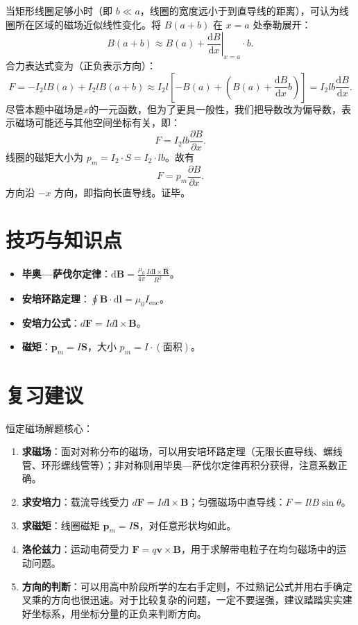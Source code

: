 \documentclass[11pt,a4paper]{ctexart}
\newcommand{\dd}{\mathrm{d}}
\begin{document}
当矩形线圈足够小时（即 $b \ll a$，线圈的宽度远小于到直导线的距离），可认为线圈所在区域的磁场近似线性变化。将 $B(a+b)$ 在 $x=a$ 处泰勒展开：
\[
B(a+b) \approx B(a) + \left.\frac{\dd B}{\dd x}\right|_{x=a} \cdot b.
\]
合力表达式变为（正负表示方向）：
\[
F = - I_2 l B(a)  + I_2 l B(a+b) \approx I_2 l \left[ - B(a) + \left( B(a) + \frac{\dd B}{\dd x} b \right) \right] = I_2 l b \frac{\dd B}{\dd x}.
\]
尽管本题中磁场是$x$的一元函数，但为了更具一般性，我们把导数改为偏导数，表示磁场可能还与其他空间坐标有关，即：
\[
F = I_2 l b\frac{\partial B}{\partial x}.
\]
线圈的磁矩大小为 $p_m = I_2 \cdot S = I_2 \cdot l b$。故有
\[
F = p_m \frac{\partial B}{\partial x}.
\]
方向沿 $−x$ 方向，即指向长直导线。证毕。

\section*{技巧与知识点}
\begin{tipBox}
\begin{itemize}
  \item \textbf{毕奥—萨伐尔定律}：\(\displaystyle \dd\boldsymbol{B} = \frac{\mu_0}{4\pi} \frac{I\dd\boldsymbol{l} \times \hat{\boldsymbol{R}}}{R^2}\)。
  \item \textbf{安培环路定理}：\(\displaystyle \oint \boldsymbol{B} \cdot \dd\boldsymbol{l} = \mu_0 I_{\text{enc}}\)。
  \item \textbf{安培力公式}：\(d \boldsymbol{F}=I d \boldsymbol{l}\times\boldsymbol{B}\)。
  \item \textbf{磁矩}：\(\displaystyle \boldsymbol{p}_m = I \boldsymbol{S}\)，大小 \(p_m = I \cdot (\text{面积})\)。
\end{itemize}
\end{tipBox}

\section*{复习建议}
\begin{tipBox}
恒定磁场解题核心：
\begin{enumerate}
  \item \textbf{求磁场}：面对对称分布的磁场，可以用安培环路定理（无限长直导线、螺线管、环形螺线管等）；非对称则用毕奥—萨伐尔定律再积分获得，注意系数正确。
  \item \textbf{求安培力}：载流导线受力 \( d \boldsymbol{F}=I d \boldsymbol{l}\times\boldsymbol{B}\)；匀强磁场中直导线：\(F=IlB\sin\theta\)。
  \item \textbf{求磁矩}：线圈磁矩 \(\boldsymbol{p}_m=I\boldsymbol{S}\)，对任意形状均如此。
  \item \textbf{洛伦兹力}：运动电荷受力 \(\boldsymbol{F}=q\boldsymbol{v}\times\boldsymbol{B}\)，用于求解带电粒子在均匀磁场中的运动问题。
  \item \textbf{方向的判断}：可以用高中阶段所学的左右手定则，不过熟记公式并用右手确定叉乘的方向也很迅速。对于比较复杂的问题，一定不要逞强，建议踏踏实实建好坐标系，用坐标分量的正负来判断方向。
\end{enumerate}
\end{tipBox}
\end{document}
